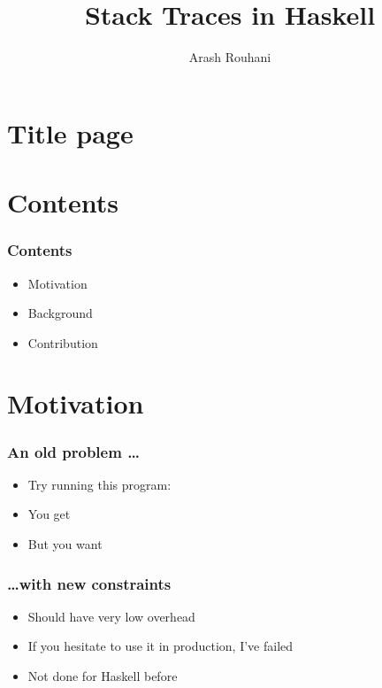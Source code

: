 \documentclass[11pt]{beamer} %
\title{Stack Traces in Haskell}
\author[Arash Rouhani]{Arash Rouhani} %
\institute{Chalmers University of Technology}
\begin{document}



\section{Title page} %
\begin{frame}[plain]
 \titlepage
\end{frame}

\section{Contents}
\begin{frame}
 \frametitle{Contents}
\begin{itemize}
 \item Motivation
 \item Background
 \item Contribution
\end{itemize}
\end{frame}

\section{Motivation}

  \begin{frame}
   \frametitle{An old problem \dots}
  \begin{itemize}
   \item <1-> Try running this program:
     \motivationCode
   \item <2-> You get
     \outputNoTrace
   \item <3-> But you want
     \outputTrace
  \end{itemize}
  \end{frame}

  \begin{frame}
   \frametitle{\dots with new constraints}
  \begin{itemize}
   \item Should have very low overhead
   \item If you hesitate to use it in production, I've failed
   \item Not done for Haskell before
  \end{itemize}
  \end{frame}
\end{document}
